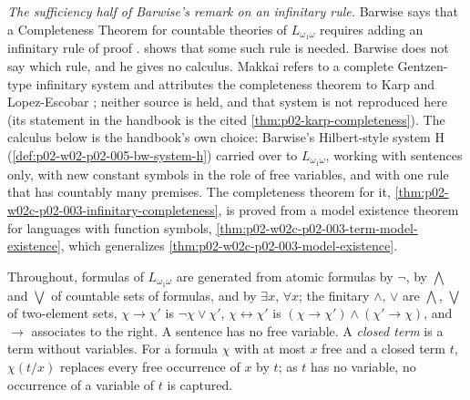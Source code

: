 \emph{The sufficiency half of Barwise's remark on an infinitary rule.}
Barwise says that a Completeness Theorem for countable theories of
\(L_{\omega_1\omega}\) requires adding an infinitary rule of proof
\cite[ch.~A.1, \S5, p.~44]{Barwise1977FirstOrder}.
 shows that some such rule is
needed.  Barwise does not say which rule, and he gives no calculus.
Makkai refers to a complete Gentzen-type infinitary system and attributes
the completeness theorem to Karp and Lopez-Escobar
\cite[ch.~A.7, \S1, p.~236]{Makkai1977}; neither source is held, and that
system is not reproduced here (its statement in the handbook is the cited
\cref{thm:p02-karp-completeness}).  The calculus below is the handbook's
own choice: Barwise's Hilbert-style system H
(\cref{def:p02-w02-p02-005-bw-system-h}) carried over to
\(L_{\omega_1\omega}\), working with sentences only, with new constant
symbols in the role of free variables, and with one rule that has
countably many premises.  The completeness theorem for it,
\cref{thm:p02-w02c-p02-003-infinitary-completeness}, is proved from a
model existence theorem for languages with function symbols,
\cref{thm:p02-w02c-p02-003-term-model-existence}, which generalizes
\cref{thm:p02-w02c-p02-003-model-existence}.

Throughout, formulas of \(L_{\omega_1\omega}\) are generated from atomic
formulas by \(\neg\), by \(\bigwedge\) and \(\bigvee\) of countable sets of
formulas, and by \(\exists x\), \(\forall x\); the finitary \(\land\),
\(\lor\) are \(\bigwedge\), \(\bigvee\) of two-element sets, \(\chi\to\chi'\)
is \(\neg\chi\lor\chi'\), \(\chi\leftrightarrow\chi'\) is
\((\chi\to\chi')\land(\chi'\to\chi)\), and \(\to\) associates to the right.
A sentence has no free variable.  A \emph{closed term} is a term without
variables.  For a formula \(\chi\) with at most \(x\) free and a closed term
\(t\), \(\chi(t/x)\) replaces every free occurrence of \(x\) by \(t\); as
\(t\) has no variable, no occurrence of a variable of \(t\) is captured.

